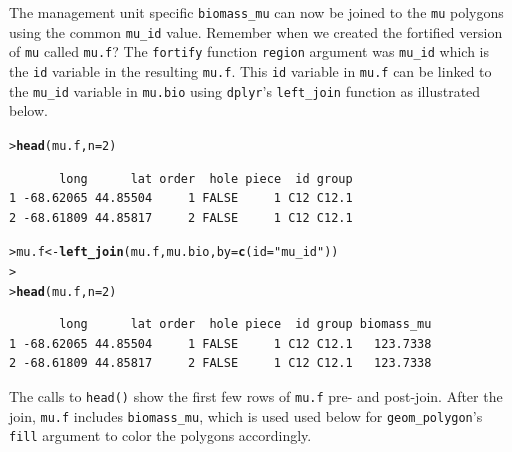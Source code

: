\documentclass[12pt,oneside]{book}\usepackage[]{graphicx}\usepackage[]{color}
\makeatletter
\newcommand{\hlnum}[1]{\textcolor[rgb]{0.686,0.059,0.569}{#1}}%
\newcommand{\hlstr}[1]{\textcolor[rgb]{0.192,0.494,0.8}{#1}}%
\newcommand{\hlstd}[1]{\textcolor[rgb]{0.345,0.345,0.345}{#1}}%
\newcommand{\hlkwb}[1]{\textcolor[rgb]{0.69,0.353,0.396}{#1}}%
\newcommand{\hlkwc}[1]{\textcolor[rgb]{0.333,0.667,0.333}{#1}}%
\newcommand{\hlkwd}[1]{\textcolor[rgb]{0.737,0.353,0.396}{\textbf{#1}}}%
\newenvironment{kframe}{%
 \def\at@end@of@kframe{}%
 \ifinner\ifhmode%
  \def\at@end@of@kframe{\end{minipage}}%
  \begin{minipage}{\columnwidth}%
 \fi\fi%
 \def\FrameCommand##1{\hskip\@totalleftmargin \hskip-\fboxsep
 \colorbox{shadecolor}{##1}\hskip-\fboxsep
     \hskip-\linewidth \hskip-\@totalleftmargin \hskip\columnwidth}%
 \MakeFramed {\advance\hsize-\width
   \@totalleftmargin\z@ \linewidth\hsize
   \@setminipage}}%
 {\par\unskip\endMakeFramed%
 \at@end@of@kframe}
\newenvironment{knitrout}{}{} %
\makeatother
\begin{document}
The management unit specific \verb+biomass_mu+ can now be joined to the \verb+mu+ polygons using the common \verb+mu_id+ value. Remember when we created the fortified version of \verb+mu+ called \verb+mu.f+? The \verb+fortify+ function \verb+region+ argument was \verb+mu_id+ which is the \verb+id+ variable in the resulting \verb+mu.f+. This \verb+id+ variable in \verb+mu.f+ can be linked to the \verb+mu_id+ variable in \verb+mu.bio+ using \verb+dplyr+'s \verb+left_join+ function as illustrated below.  
\begin{knitrout}
\color{fgcolor}\begin{kframe}
\begin{alltt}
\hlstd{> }\hlkwd{head}\hlstd{(mu.f,} \hlkwc{n} \hlstd{=} \hlnum{2}\hlstd{)}
\end{alltt}
\begin{verbatim}
       long      lat order  hole piece  id group
1 -68.62065 44.85504     1 FALSE     1 C12 C12.1
2 -68.61809 44.85817     2 FALSE     1 C12 C12.1
\end{verbatim}
\begin{alltt}
\hlstd{> }\hlstd{mu.f} \hlkwb{<-} \hlkwd{left_join}\hlstd{(mu.f, mu.bio,} \hlkwc{by} \hlstd{=} \hlkwd{c}\hlstd{(}\hlkwc{id} \hlstd{=} \hlstr{"mu_id"}\hlstd{))}
\hlstd{> }
\hlstd{> }\hlkwd{head}\hlstd{(mu.f,} \hlkwc{n} \hlstd{=} \hlnum{2}\hlstd{)}
\end{alltt}
\begin{verbatim}
       long      lat order  hole piece  id group biomass_mu
1 -68.62065 44.85504     1 FALSE     1 C12 C12.1   123.7338
2 -68.61809 44.85817     2 FALSE     1 C12 C12.1   123.7338
\end{verbatim}
\end{kframe}
\end{knitrout}
The calls to \verb+head()+ show the first few rows of \verb+mu.f+ pre- and post-join. After the join, \verb+mu.f+ includes \verb+biomass_mu+, which is used used below for \verb+geom_polygon+'s \verb+fill+ argument to color the polygons accordingly. 
\end{document}
